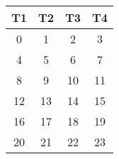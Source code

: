 \begin{tabular}{|c|c|c|c|}
\hline
{{{T1}}}&{{{T2}}}&{{{T3}}}&{{{T4}}}\\\hline
0&1&2&3\\\hline
4&5&6&7\\\hline
8&9&10&11\\\hline
12&13&14&15\\\hline
16&17&18&19\\\hline
20&21&22&23\\\hline

\end{tabular}